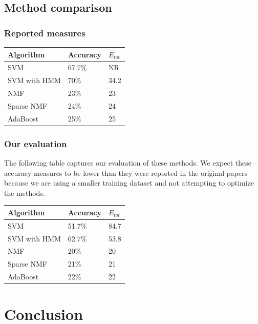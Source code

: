 \documentclass[5p]{elsarticle}
\begin{document}
\subsection{Method comparison}

\subsubsection{Reported measures}
\begin{center}
\begin{tabular}{|l|l|l|}
\hline
Algorithm & Accuracy & $E_{tot}$ \\ \hline
SVM & 67.7\% & NR \\ \hline
SVM with HMM & 70\% & 34.2 \\ \hline
NMF & 23\% & 23 \\ \hline
Sparse NMF & 24\% & 24 \\ \hline
AdaBoost & 25\% & 25 \\ \hline
\end{tabular}
\end{center}

\subsubsection{Our evaluation}

The following table captures our evaluation of these methods. We expect these accuracy measures to be lower than they were reported in the original papers because we are using a smaller training dataset and not attempting to optimize the methods.

\begin{center}
\begin{tabular}{|l|l|l|}
\hline
Algorithm & Accuracy & $E_{tot}$ \\ \hline
SVM & 51.7\% & 84.7  \\ \hline
SVM with HMM & 62.7\% & 53.8  \\ \hline
NMF & 20\% & 20 \\ \hline
Sparse NMF & 21\% & 21 \\ \hline
AdaBoost & 22\% & 22 \\ \hline
\end{tabular}
\end{center}

\section{Conclusion}
\end{document}
